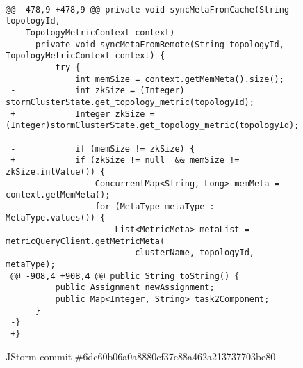 \begin{figure*}
\begin{lstlisting}

@@ -478,9 +478,9 @@ private void syncMetaFromCache(String topologyId, 
    TopologyMetricContext context)
      private void syncMetaFromRemote(String topologyId, TopologyMetricContext context) {
          try {
              int memSize = context.getMemMeta().size();
 -            int zkSize = (Integer) stormClusterState.get_topology_metric(topologyId);
 +            Integer zkSize = (Integer)stormClusterState.get_topology_metric(topologyId);
  
 -            if (memSize != zkSize) {
 +            if (zkSize != null  && memSize != zkSize.intValue()) {
                  ConcurrentMap<String, Long> memMeta = context.getMemMeta();
                  for (MetaType metaType : MetaType.values()) {
                      List<MetricMeta> metaList = metricQueryClient.getMetricMeta(
                          clusterName, topologyId, metaType);
 @@ -908,4 +908,4 @@ public String toString() {
          public Assignment newAssignment;
          public Map<Integer, String> task2Component;
      }
 -}
 +} 

\end{lstlisting}
\caption{JStorm commit \#6dc60b06a0a8880cf37c88a462a213737703be80\label{fig:backward}}
\end{figure*}